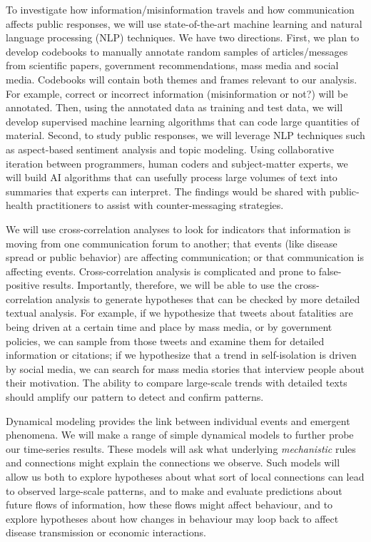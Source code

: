 

To investigate how information/misinformation travels and how communication affects public responses, we will use state-of-the-art machine learning and natural language processing (NLP) techniques. We have two directions. First, we plan to develop codebooks to manually annotate random samples of articles/messages from scientific papers, government recommendations, mass media and social media. Codebooks will contain both themes and frames relevant to our analysis. For example, correct or incorrect information (misinformation or not?) will be annotated. Then, using the annotated data as training and test data, we will develop supervised machine learning algorithms that can code large quantities of material. Second, to study public responses, we will leverage NLP techniques such as aspect-based sentiment analysis and topic modeling. Using collaborative iteration between programmers, human coders and subject-matter experts, we will build AI algorithms that can usefully process large volumes of text into summaries that experts can interpret. The findings would be shared with public-health practitioners to assist with counter-messaging strategies. 


We will use cross-correlation analyses to look for indicators that information is moving from one communication forum to another; that events (like disease spread or public behavior) are affecting communication; or that communication is affecting events. 
Cross-correlation analysis is complicated and prone to false-positive results. Importantly, therefore, we will be able to use the cross-correlation analysis to generate hypotheses that can be checked by more detailed textual analysis. For example, if we hypothesize that tweets about fatalities are being driven at a certain time and place by mass media, or by government policies, we can sample from those tweets and examine them for detailed information or citations; if we hypothesize that a trend in self-isolation is driven by social media, we can search for mass media stories that interview people about their motivation. The ability to compare large-scale trends with detailed texts should amplify our pattern to detect and confirm patterns. 

 Dynamical modeling provides the link between individual events and emergent phenomena. 
We will make a range of simple dynamical models to further probe our time-series results.
These models will ask what underlying \emph{mechanistic} rules and connections might explain the connections we observe. 
Such models will allow us both to explore hypotheses about what sort of local connections can lead to observed large-scale patterns, and to make and evaluate predictions about future flows of information, how these flows might affect behaviour, and to explore hypotheses about how changes in behaviour may loop back to affect disease transmission or economic interactions. 

